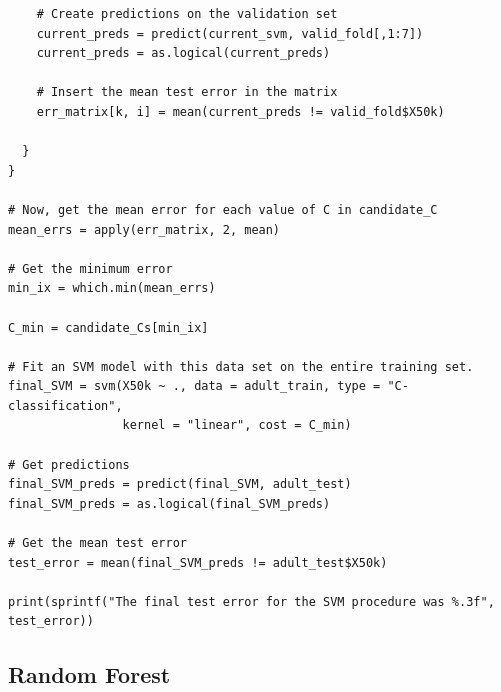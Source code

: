 \documentclass{article}
\begin{document}
\begin{verbatim}
    # Create predictions on the validation set
    current_preds = predict(current_svm, valid_fold[,1:7])
    current_preds = as.logical(current_preds)
    
    # Insert the mean test error in the matrix 
    err_matrix[k, i] = mean(current_preds != valid_fold$X50k)
    
  }
}

# Now, get the mean error for each value of C in candidate_C
mean_errs = apply(err_matrix, 2, mean)

# Get the minimum error
min_ix = which.min(mean_errs)

C_min = candidate_Cs[min_ix]

# Fit an SVM model with this data set on the entire training set. 
final_SVM = svm(X50k ~ ., data = adult_train, type = "C-classification",
                kernel = "linear", cost = C_min)

# Get predictions 
final_SVM_preds = predict(final_SVM, adult_test)
final_SVM_preds = as.logical(final_SVM_preds)

# Get the mean test error 
test_error = mean(final_SVM_preds != adult_test$X50k)

print(sprintf("The final test error for the SVM procedure was %.3f", test_error))

\end{verbatim}

\subsection{Random Forest}

    
\end{document}
